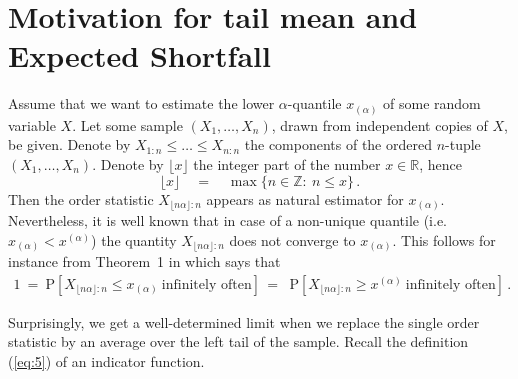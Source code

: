 \documentclass[11pt,a4paper,leqno]{article}
\begin{document}

\section{Motivation for tail mean and Expected Shortfall}
\label{sec:2}
\setcounter{equation}{0}


Assume that we want to estimate the lower $\alpha$-quantile $x_{(\alpha)}$ of some random
variable $X$. Let some sample $(X_1, \ldots, X_n)$, drawn from independent copies of $X$,
be given. Denote by
$X_{1:n} \le \ldots \le X_{n:n}$ the components of the ordered $n$-tuple $(X_1, \ldots, X_n)$.
Denote by $\lfloor x\rfloor$ the integer part of  the number $x\in\mathbb{R}$, hence
$$
\lfloor x\rfloor \quad =\quad  \max\{n\in\mathbb{Z}:\ n \le x\}\,.
$$
Then the order statistic $X_{\lfloor n \alpha\rfloor:n}$ 
appears as natural estimator for $x_{(\alpha)}$.
Nevertheless, it is well known that in case of a non-unique quantile (i.e.
$x_{(\alpha)} < x^{(\alpha)}$) the quantity $X_{\lfloor n \alpha\rfloor:n}$ 
does not converge to $x_{(\alpha)}$. This follows for instance from Theorem~1 in \cite{FT66} which says
that
\begin{eqnarray*}
1\ = \  \mathrm{P}[X_{\lfloor n \alpha\rfloor:n} \le x_{(\alpha)}\ \mbox{infinitely often}] & 
= &   \mathrm{P}[X_{\lfloor n \alpha\rfloor:n} \ge x^{(\alpha)}\ \mbox{infinitely often}]\,.
\end{eqnarray*}

Surprisingly, we get a well-determined limit when we replace the single order statistic
by an average over the left tail of the sample. Recall the definition (\ref{eq:5}) of an indicator function.
\end{document}
